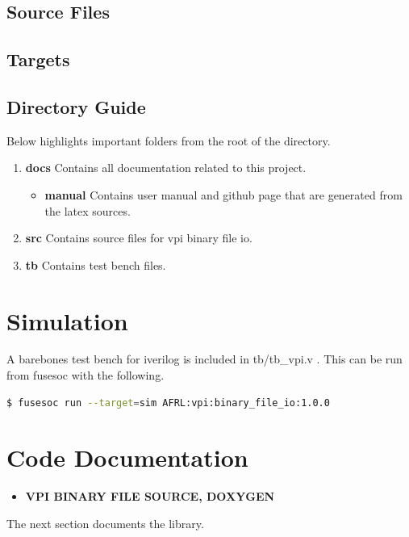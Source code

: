 \subsection{Source Files}



\subsection{Targets} \label{targets}



\subsection{Directory Guide}

\par
Below highlights important folders from the root of the directory.

\begin{enumerate}
  \item \textbf{docs} Contains all documentation related to this project.
    \begin{itemize}
      \item \textbf{manual} Contains user manual and github page that are generated from the latex sources.
    \end{itemize}
  \item \textbf{src} Contains source files for vpi binary file io.
  \item \textbf{tb} Contains test bench files.
\end{enumerate}

\newpage

\section{Simulation}
\par
A barebones test bench for iverilog is included in tb/tb\_vpi.v . This can be run from fusesoc with the following.
\begin{lstlisting}[language=bash]
$ fusesoc run --target=sim AFRL:vpi:binary_file_io:1.0.0
\end{lstlisting}

\newpage

\section{Code Documentation} \label{Module Documentation}

\begin{itemize}
\item \textbf{VPI BINARY FILE SOURCE, DOXYGEN}
\end{itemize}
The next section documents the library.

